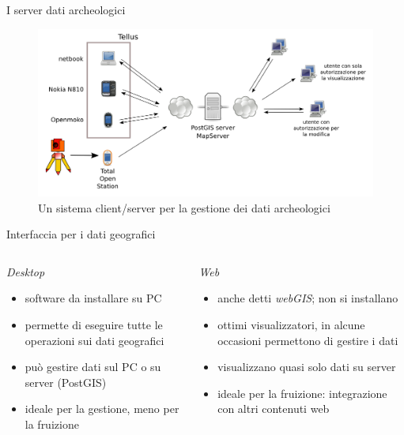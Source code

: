 \documentclass{beamer}
\begin{document}
        \begin{frame}{I server dati archeologici}
            \begin{figure}
                \centering
                \includegraphics[width=1\linewidth]{schematellus}
                \caption[Un sistema client/server per la gestione dei dati archeologici]{Un sistema client/server per la gestione dei dati archeologici}
                \label{fig:tellus}
            \end{figure}
        \end{frame}

        \begin{frame}{Interfaccia per i dati geografici}
            \begin{columns}[c]
                    \begin{center}
                        \emph{Desktop}
                            \begin{itemize}
                                \item software da installare su PC
                                \item permette di eseguire tutte le operazioni sui dati geografici
                                \item può gestire dati sul PC o su server (PostGIS)
                                \item ideale per la gestione, meno per la fruizione
                            \end{itemize}
                    \end{center}
                    \begin{center}
                        \emph{Web}
                        \begin{itemize}
                            \item anche detti \emph{webGIS}; non si installano
                            \item ottimi visualizzatori, in alcune occasioni permettono di gestire i dati
                            \item visualizzano quasi solo dati su server
                            \item ideale per la fruizione: integrazione con altri contenuti web
                        \end{itemize}
                    \end{center}
            \end{columns}
        \end{frame}
\end{document}
